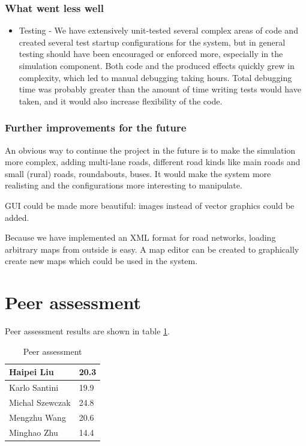 \documentclass[a4paper,12pt]{article}
\begin{document}
\subsubsection*{What went less well}
\begin{itemize}
	\item Testing - We have extensively unit-tested several complex areas of code and created several test startup configurations for the system, but in general testing should have been encouraged or enforced more, especially in the simulation component. Both code and the produced effects quickly grew in complexity, which led to manual debugging taking hours. Total debugging time was probably greater than the amount of time writing tests would have taken, and it would also increase flexibility of the code.
\end{itemize}

\subsubsection*{Further improvements for the future}

An obvious way to continue the project in the future is to make the simulation more complex, adding multi-lane roads, different road kinds like main roads and small (rural) roads, roundabouts, buses. It would make the system more realisting and the configurations more interesting to manipulate.

GUI could be made more beautiful: images instead of vector graphics could be added.

Because we have implemented an XML format for road networks, loading arbitrary maps from outside is easy. A map editor can be created to graphically create new maps which could be used in the system.

\section{Peer assessment}

Peer assessment results are shown in table \ref{table:assessment}.

\begin{table}[!htb]
\centering
\caption{Peer assessment}
\label{table:assessment}
\begin{tabular}{|l|l|}
\hline
Haipei Liu      & 20.3 \\ \hline
Karlo Santini   & 19.9 \\ \hline
Michal Szewczak & 24.8 \\ \hline
Mengzhu Wang    & 20.6 \\ \hline
Minghao Zhu     & 14.4 \\ \hline
\end{tabular}
\end{table}
\end{document}
